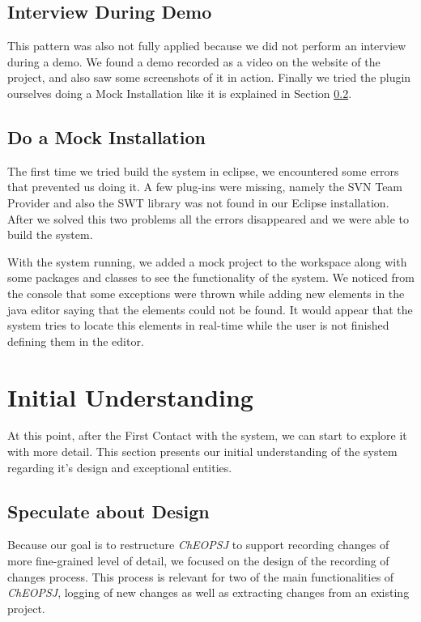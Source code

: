 \documentclass[a4paper]{article}
\begin{document}
\subsection{Interview During Demo}
This pattern was also not fully applied because we did not perform an interview during a demo. We found a demo recorded as a video on the website of the project, and also saw some screenshots of it in action. Finally we tried the plugin ourselves doing a Mock Installation like it is explained in Section \ref{sec:mock}.

\subsection{Do a Mock Installation}
\label{sec:mock}
The first time we tried build the system in eclipse, we encountered some errors that prevented us doing it. A few plug-ins were missing, namely the SVN Team Provider and also the SWT library was not found in our Eclipse installation. After we solved this two problems all the errors disappeared and we were able to build the system. 

With the system running, we added a mock project to the workspace along with some packages and classes to see the functionality of the system. We noticed from the console that some exceptions were thrown while adding new elements in the java editor saying that the elements could not be found. It would appear that the system tries to locate this elements in real-time while the user is not finished defining them in the editor.

\section{Initial Understanding}
At this point, after the First Contact with the system, we can start to explore it with more detail. This section presents our initial understanding of the system regarding it's design and exceptional entities.

\subsection{Speculate about Design}
Because our goal is to restructure \emph{ChEOPSJ} to support recording changes of more fine-grained level of detail, we focused on the design of the recording of changes process. This process is relevant for two of the main functionalities of \emph{ChEOPSJ}, logging of new changes as well as extracting changes from an existing project.
\end{document}

